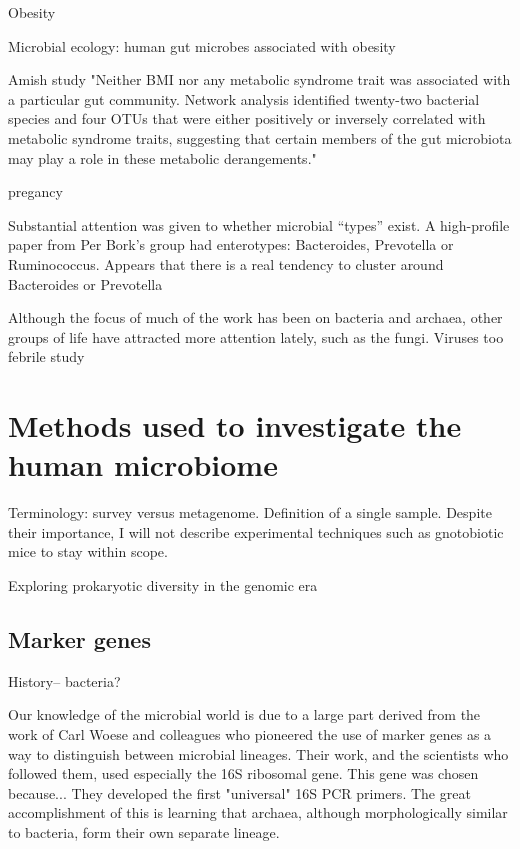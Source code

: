 \documentclass{amsart}
\begin{document}
Obesity

Microbial ecology: human gut microbes associated with obesity \cite{ley2006microbial}

Amish study \cite{zupancic2012analysis}
"Neither BMI nor any metabolic syndrome trait was associated with a particular gut community. Network analysis identified twenty-two bacterial species and four OTUs that were either positively or inversely correlated with metabolic syndrome traits, suggesting that certain members of the gut microbiota may play a role in these metabolic derangements."

pregancy \cite{koren2012host}


Substantial attention was given to whether microbial ``types'' exist.
A high-profile paper from Per Bork's group had enterotypes: Bacteroides, Prevotella or Ruminococcus.
\cite{arumugam2011enterotypes}
Appears that there is a real tendency to cluster around Bacteroides or Prevotella \cite{wu2011linking}

Although the focus of much of the work has been on bacteria and archaea, other groups of life have attracted more attention lately, such as the fungi.
Viruses too
febrile study \cite{wylie2012sequence}



\section{Methods used to investigate the human microbiome}

Terminology: survey versus metagenome.
Definition of a single sample.
Despite their importance, I will not describe experimental techniques such as gnotobiotic mice to stay within scope.

\cite{hugenholtz2002review}
{Exploring prokaryotic diversity in the genomic era}


\subsection{Marker genes}
History-- bacteria?

Our knowledge of the microbial world is due to a large part derived from the work of Carl Woese and colleagues who pioneered the use of marker genes as a way to distinguish between microbial lineages.
Their work, and the scientists who followed them, used especially the 16S ribosomal gene.
This gene was chosen because...
They developed the first "universal" 16S PCR primers.
The great accomplishment of this is learning that archaea, although morphologically similar to bacteria, form their own separate lineage.
\end{document}

